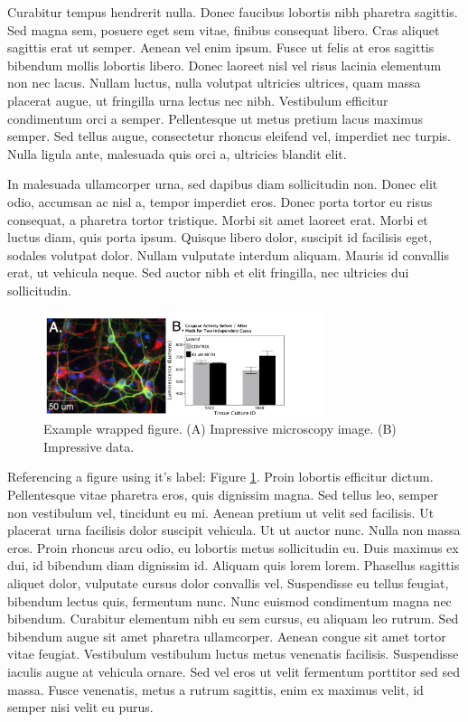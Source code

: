 \documentclass[11pt, notitlepage]{article} %
\begin{document}
Curabitur tempus hendrerit nulla. Donec faucibus lobortis nibh pharetra sagittis. Sed magna sem, posuere eget sem vitae, finibus consequat libero. Cras aliquet sagittis erat ut semper. Aenean vel enim ipsum. Fusce ut felis at eros sagittis bibendum mollis lobortis libero. Donec laoreet nisl vel risus lacinia elementum non nec lacus. Nullam luctus, nulla volutpat ultricies ultrices, quam massa placerat augue, ut fringilla urna lectus nec nibh. Vestibulum efficitur condimentum orci a semper. Pellentesque ut metus pretium lacus maximus semper. Sed tellus augue, consectetur rhoncus eleifend vel, imperdiet nec turpis. Nulla ligula ante, malesuada quis orci a, ultricies blandit elit.

In malesuada ullamcorper urna, sed dapibus diam sollicitudin non. Donec elit odio, accumsan ac nisl a, tempor imperdiet eros. Donec porta tortor eu risus consequat, a pharetra tortor tristique. Morbi sit amet laoreet erat. Morbi et luctus diam, quis porta ipsum. Quisque libero dolor, suscipit id facilisis eget, sodales volutpat dolor. Nullam vulputate interdum aliquam. Mauris id convallis erat, ut vehicula neque. Sed auctor nibh et elit fringilla, nec ultricies dui sollicitudin.

\begin{figure} %
	\includegraphics[width=8.2cm]{Figures/Fig1.jpg}
	\caption{\footnotesize Example wrapped figure. (A) Impressive microscopy image. (B) Impressive data.}
	\label{fig:example}
\end{figure}

Referencing a figure using it's label: Figure \ref{fig:example}. Proin lobortis efficitur dictum. Pellentesque vitae pharetra eros, quis dignissim magna. Sed tellus leo, semper non vestibulum vel, tincidunt eu mi. Aenean pretium ut velit sed facilisis. Ut placerat urna facilisis dolor suscipit vehicula. Ut ut auctor nunc. Nulla non massa eros. Proin rhoncus arcu odio, eu lobortis metus sollicitudin eu. Duis maximus ex dui, id bibendum diam dignissim id. Aliquam quis lorem lorem. Phasellus sagittis aliquet dolor, vulputate cursus dolor convallis vel. Suspendisse eu tellus feugiat, bibendum lectus quis, fermentum nunc. Nunc euismod condimentum magna nec bibendum. Curabitur elementum nibh eu sem cursus, eu aliquam leo rutrum. Sed bibendum augue sit amet pharetra ullamcorper. Aenean congue sit amet tortor vitae feugiat. Vestibulum vestibulum luctus metus venenatis facilisis. Suspendisse iaculis augue at vehicula ornare. Sed vel eros ut velit fermentum porttitor sed sed massa. Fusce venenatis, metus a rutrum sagittis, enim ex maximus velit, id semper nisi velit eu purus.
\end{document}
